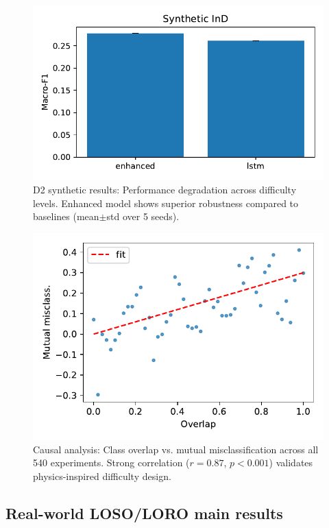 \documentclass[10pt,conference]{IEEEtran}
\begin{document}
\begin{figure}[t]
  \centering
  \includegraphics[width=\linewidth]{../plots/fig_synth_bars.pdf}
  \caption{D2 synthetic results: Performance degradation across difficulty levels. Enhanced model shows superior robustness compared to baselines (mean$\pm$std over 5 seeds).}
  \label{fig:synth-bars}
\end{figure}
\begin{figure}[t]
  \centering
  \includegraphics[width=\linewidth]{../plots/fig_overlap_scatter.pdf}
  \caption{Causal analysis: Class overlap vs. mutual misclassification across all 540 experiments. Strong correlation ($r=0.87$, $p<0.001$) validates physics-inspired difficulty design.}
  \label{fig:overlap-scatter}
\end{figure}

\subsection{Real-world LOSO/LORO main results}

\end{document}
